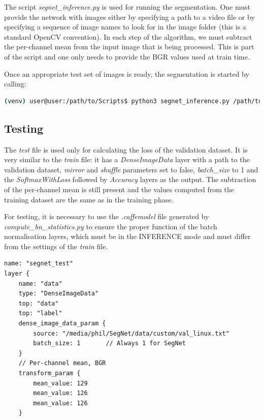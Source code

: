 The script \textit{segnet\_inference.py} is used for running the segmentation. One must provide the network with images either by specifying a path to a video file or by specifying a sequence of image names to look for in the image folder (this is a standard OpenCV convention). In each step of the algorithm, we must subtract the per-channel mean from the input image that is being processed. This is part of the script and one only needs to provide the BGR values used at train time.

Once an appropriate test set of images is ready, the segmentation is started by calling:

\begin{lstlisting}[language=bash]
(venv) user@user:/path/to/Scripts$ python3 segnet_inference.py /path/to/inference.prototxt /path/to/final_weights.caffemodel /path/to/videofile.avi 
\end{lstlisting}

\subsection{Testing}

The \textit{test} file is used only for calculating the loss of the validation dataset. It is very similar to the \textit{train} file: it has a \textit{DenseImageData} layer with a path to the validation dataset, \textit{mirror} and \textit{shuffle} parameters set to false, \textit{batch\_size} to 1 and the \textit{SoftmaxWithLoss} followed by \textit{Accuracy} layers as the output. The subtraction of the per-channel mean is still present and the values computed from the training dataset are the same as in the training phase. 

For testing, it is necessary to use the \textit{.caffemodel} file generated by \textit{compute\_bn\_statistics.py} to ensure the proper function of the batch normalisation layers, which must be in the INFERENCE mode and must differ from the settings of the \textit{train} file.

\begin{lstlisting}[caption={Setting up the input layer of \textit{test.prototxt} \cite{filip_github}},captionpos=b]
name: "segnet_test"
layer {
	name: "data"
	type: "DenseImageData"
	top: "data"
	top: "label"
	dense_image_data_param {
		source: "/media/phil/SegNet/data/custom/val_linux.txt"	
		batch_size: 1		// Always 1 for SegNet
	}
	// Per-channel mean, BGR
	transform_param {
		mean_value: 129
		mean_value: 126
		mean_value: 126 
	}  
	
\end{lstlisting}

